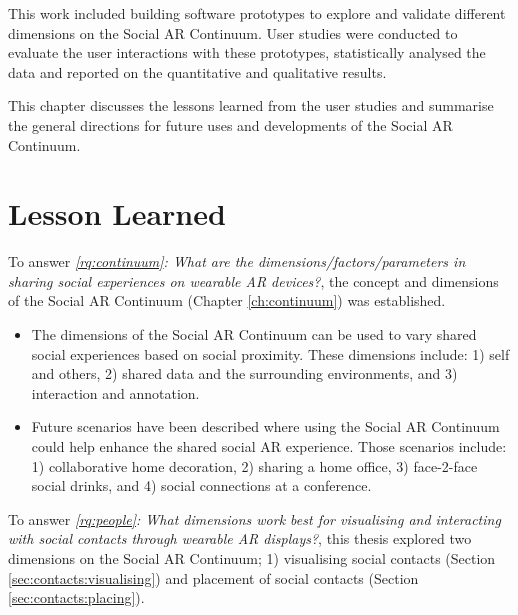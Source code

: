 This work included building software prototypes to explore and validate different dimensions on the Social AR Continuum. User studies were conducted to evaluate the user interactions with these prototypes, statistically analysed the data and reported on the quantitative and qualitative results. 

This chapter discusses the lessons learned from the user studies and summarise the general directions for future uses and developments of the Social AR Continuum. 

\pagebreak

\section{Lesson Learned}
\noindent
To answer \textit{\ref{rq:continuum}: What are the dimensions/factors/parameters in sharing social experiences on wearable AR devices?}, the concept and dimensions of the Social AR Continuum (Chapter \ref{ch:continuum}) was established.

\begin{itemize}
    \item{The dimensions of the Social AR Continuum can be used to vary shared social experiences based on social proximity. These dimensions include: 1) self and others, 2) shared data and the surrounding environments, and 3) interaction and annotation.}
    \item{Future scenarios have been described where using the Social AR Continuum could help enhance the shared social AR experience. Those scenarios include: 1) collaborative home decoration, 2) sharing a home office, 3) face-2-face social drinks, and 4) social connections at a conference.}
\end{itemize}

\noindent
To answer \textit{\ref{rq:people}: What dimensions work best for visualising and interacting with social contacts through wearable AR displays?}, this thesis explored two dimensions on the Social AR Continuum; 1) visualising social contacts (Section \ref{sec:contacts:visualising}) and placement of social contacts (Section \ref{sec:contacts:placing}). 

